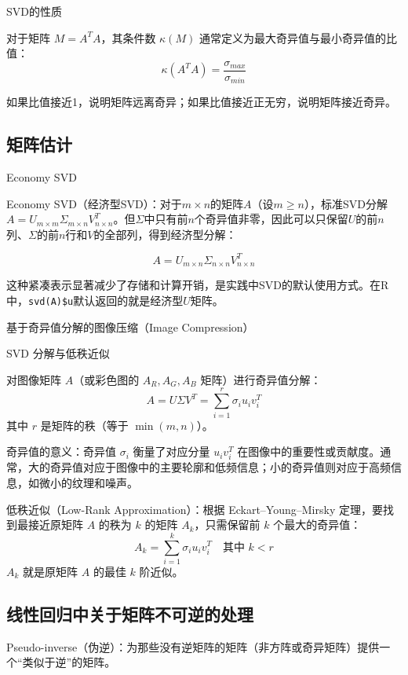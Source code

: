 \documentclass[
]{book}
\begin{document}
SVD的性质

对于矩阵 \(M = A^T A\)，其条件数 \(\kappa(M)\) 通常定义为最大奇异值与最小奇异值的比值：\[\kappa(A^T A) = \frac{\sigma_{max}}{\sigma_{min}}\]

如果比值接近1，说明矩阵远离奇异；如果比值接近正无穷，说明矩阵接近奇异。

\subsection{矩阵估计}\label{ux77e9ux9635ux4f30ux8ba1}

Economy SVD

Economy SVD（经济型SVD）：对于\(m \times n\)的矩阵\(A\)（设\(m \geq n\)），标准SVD分解\(A = U_{m \times m} \Sigma_{m \times n} V^T_{n \times n}\)。但\(\Sigma\)中只有前\(n\)个奇异值非零，因此可以只保留\(U\)的前\(n\)列、\(\Sigma\)的前\(n\)行和\(V\)的全部列，得到经济型分解：

\[A = U_{m \times n} \Sigma_{n \times n} V^T_{n \times n}\]

这种紧凑表示显著减少了存储和计算开销，是实践中SVD的默认使用方式。在R中，\texttt{svd(A)\$u}默认返回的就是经济型\(U\)矩阵。

基于奇异值分解的图像压缩（Image Compression）

SVD 分解与低秩近似

对图像矩阵 \(A\)（或彩色图的 \(A_R, A_G, A_B\) 矩阵）进行奇异值分解：\[A = U \Sigma V^T = \sum_{i=1}^{r} \sigma_i u_i v_i^T\]其中 \(r\) 是矩阵的秩（等于 \(\min(m, n)\)）。

奇异值的意义：奇异值 \(\sigma_i\) 衡量了对应分量 \(u_i v_i^T\) 在图像中的重要性或贡献度。通常，大的奇异值对应于图像中的主要轮廓和低频信息；小的奇异值则对应于高频信息，如微小的纹理和噪声。

低秩近似（Low-Rank Approximation）：根据 Eckart--Young--Mirsky 定理，要找到最接近原矩阵 \(A\) 的秩为 \(k\) 的矩阵 \(A_k\)，只需保留前 \(k\) 个最大的奇异值：\[A_k = \sum_{i=1}^{k} \sigma_i u_i v_i^T \quad \text{其中 } k < r\]\(A_k\) 就是原矩阵 \(A\) 的最佳 \(k\) 阶近似。

\subsection{线性回归中关于矩阵不可逆的处理}\label{ux7ebfux6027ux56deux5f52ux4e2dux5173ux4e8eux77e9ux9635ux4e0dux53efux9006ux7684ux5904ux7406}

Pseudo-inverse（伪逆）：为那些没有逆矩阵的矩阵（非方阵或奇异矩阵）提供一个``类似于逆''的矩阵。
\end{document}
